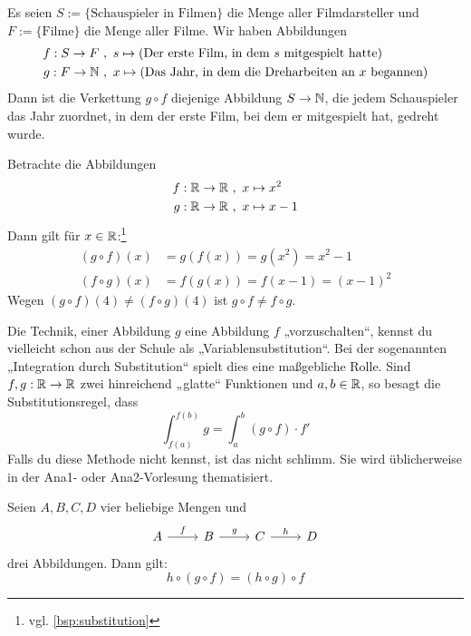 \begin{bsp}
    Es seien $S:= \{ \text{Schauspieler in Filmen}\}$ die Menge aller Filmdarsteller und $F:=\{\text{Filme}\}$ die Menge aller Filme. Wir haben Abbildungen
    \begin{align*}
        f : S \to F \ & ,\ s\mapsto (\text{Der erste Film, in dem $s$ mitgespielt hatte}) \\
        g : F \to \mathbb N \ & ,\ x \mapsto (\text{Das Jahr, in dem die Dreharbeiten an $x$ begannen})
    \end{align*}
    Dann ist die Verkettung $g\circ f$ diejenige Abbildung $S\to \mathbb N$, die jedem Schauspieler das Jahr zuordnet, in dem der erste Film, bei dem er mitgespielt hat, gedreht wurde.
\end{bsp}


\begin{bsp} \label{bsp:verkettung}
    Betrachte die Abbildungen
    \begin{align*}
        f : \mathbb R \to \mathbb R \ &,\ x\mapsto x^2 \\
        g : \mathbb R \to \mathbb R \ &,\ x \mapsto x-1
    \end{align*}
    Dann gilt für $x\in \mathbb R$:\footnote{vgl. \cref{bsp:substitution}}
    \begin{align*}
        (g\circ f)(x) & = g(f(x)) = g(x^2) = x^2-1 \\
        (f\circ g)(x) & = f(g(x)) = f(x-1) = (x-1)^2
    \end{align*}
    Wegen $(g\circ f)(4)\neq (f\circ g)(4)$ ist $g\circ f\neq f\circ g$.
\end{bsp}


\begin{vorschau}
    Die Technik, einer Abbildung $g$ eine Abbildung $f$ „vorzuschalten“, kennst du vielleicht schon aus der Schule als „Variablensubstitution“. Bei der sogenannten „Integration durch Substitution“ spielt dies eine maßgebliche Rolle. Sind $f,g:\mathbb R\to \mathbb R$ zwei hinreichend „glatte“ Funktionen und $a,b\in \mathbb R$, so besagt die Substitutionsregel, dass
        \[ \int_{f(a)}^{f(b)} g = \int_a^b (g\circ f) \cdot f' \]
    Falls du diese Methode nicht kennst, ist das nicht schlimm. Sie wird üblicherweise in der Ana1- oder Ana2-Vorlesung thematisiert.
\end{vorschau}


\begin{satz} \label{abbassoziativ}
    Seien $A,B,C,D$ vier beliebige Mengen und
    \[\begin{tikzcd}
        A \ar[r, "f"] & B \ar[r, "g"] & C \ar[r, "h"] & D
    \end{tikzcd}\]
    drei Abbildungen. Dann gilt:
        \[ h\circ (g\circ f) = (h\circ g)\circ f\]
\end{satz}



